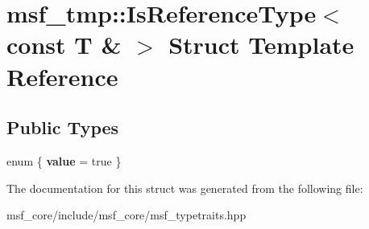 \hypertarget{structmsf__tmp_1_1IsReferenceType_3_01const_01T_01_6_01_4}{\section{msf\-\_\-tmp\-:\-:Is\-Reference\-Type$<$ const T \& $>$ Struct Template Reference}
\label{structmsf__tmp_1_1IsReferenceType_3_01const_01T_01_6_01_4}
}
\subsection*{Public Types}
\begin{DoxyCompactItemize}
\item 
enum \{ {\bfseries value} =  true
 \}
\end{DoxyCompactItemize}


The documentation for this struct was generated from the following file\-:\begin{DoxyCompactItemize}
\item 
msf\-\_\-core/include/msf\-\_\-core/msf\-\_\-typetraits.\-hpp\end{DoxyCompactItemize}
